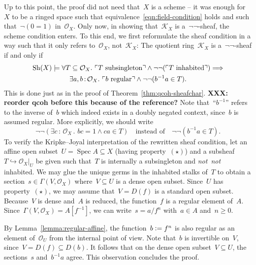 \documentclass[10pt,reqno,a4paper]{amsbook}
\makeatletter
\theoremstyle{definition}
\theoremstyle{plain}
\theoremstyle{remark}
\renewcommand{\O}{\mathcal{O}}
\newcommand{\K}{\mathcal{K}}
\newcommand{\Sh}{\mathrm{Sh}}
\DeclareMathOperator{\Spec}{Spec}
\newcommand{\?}{\,{:}\,}
\renewcommand{\_}{\mathpunct{.}\,}
\newcommand{\speak}[1]{\ulcorner\text{\textnormal{#1}}\urcorner}
\newcommand{\notnot}{\emph{not~not}\xspace}
\newcommand{\XXX}[1]{\textbf{XXX: #1}}
\newcommand{\defeq}{\vcentcolon=}
\renewenvironment{proof}[1][\proofname]{\par
  \pushQED{\qed}%
  \normalfont \topsep6\p@\@plus6\p@\relax
  \trivlist
  \item[\hskip\labelsep
        \itshape
    #1\@addpunct{.}]\ignorespaces
}{%
  \popQED\endtrivlist\@endpefalse
}
\makeatother
\begin{document}
\begin{proof}
Up to this point, the proof did not need that~$X$ is a scheme -- it was enough
for~$X$ to be a ringed space such that equivalence~\eqref{eqn:field-condition} holds and
such that~$\neg(0 = 1)$ in~$\O_X$. Only now, in showing that~$\K_X$ is
a~$\neg\neg$-sheaf, the scheme condition enters. To this end, we first
reformulate the sheaf condition in a way such that it only refers to~$\O_X$,
not~$\K_X$: The quotient ring~$\K_X$ is a~$\neg\neg$-sheaf if and only if
\begin{multline*}
  \Sh(X) \models \forall T \subseteq \O_X\_
  \speak{$T$ subsingleton} \wedge \neg\neg(\speak{$T$ inhabited})
  \Longrightarrow \\
  \exists a,b\?\O_X\_ \speak{$b$ regular} \wedge \neg\neg(b^{-1} a \in T).
\end{multline*}
This is done just as in the proof of Theorem~\ref{thm:qcoh-sheafchar}.
\XXX{reorder qcoh before this because of the reference?}
Note
that~``$b^{-1}$'' refers to the inverse of~$b$ which indeed exists in a doubly
negated context, since~$b$ is assumed regular. More explicitly, we should write
\[ \neg\neg(\exists c\?\O_X\_ bc = 1 \wedge ca \in T)
  \quad\text{instead of}\quad
  \neg\neg(b^{-1} a \in T). \]
To verify the Kripke--Joyal interpretation of the rewritten sheaf condition, let
an affine open subset~$U = \Spec A \subseteq X$ (having property~$(\star)$) and a subsheaf~$T
\hookrightarrow \O_X|_U$ be given such that~$T$ is internally a subsingleton
and \notnot inhabited. We may glue the unique germs in the inhabited
stalks of~$T$ to obtain a section~$s \in \Gamma(V,\O_X)$ where~$V \subseteq U$
is a dense open subset. Since~$U$ has property~$(\star)$, we may assume that~$V
= D(f)$ is a standard open subset. Because~$V$ is dense and~$A$ is reduced, the
function~$f$ is a regular element of~$A$.
Since~$\Gamma(V,\O_X) = A[f^{-1}]$, we can write~$s = a/f^n$ with~$a \in A$
and~$n \geq 0$.

By Lemma~\ref{lemma:regular-affine}, the function~$b \defeq f^n$ is also regular as an
element of~$\O_U$ from the internal point of view. Note that~$b$ is invertible
on~$V$, since~$V = D(f) \subseteq D(b)$. It follows that on the dense
open subset~$V \subseteq U$, the sections~$s$ and~$b^{-1} a$ agree.
This observation concludes the proof.
\end{proof}
\end{document}
